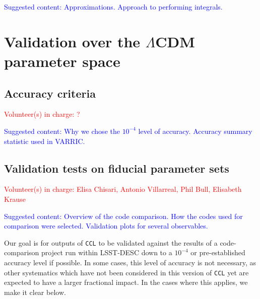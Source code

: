 \documentclass[\docopts]{\docclass}
\newcommand{\vol}[1]{\textcolor{red}{Volunteer(s) in charge: #1}}
\newcommand{\cont}[1]{\textcolor{blue}{Suggested content: #1}}
\newcommand{\ccl}{{\tt CCL}\xspace}
\begin{document}
\cont{Approximations. Approach to performing integrals.}




\section{Validation over the $\Lambda$CDM parameter space}

\subsection{Accuracy criteria}
\vol{?}

\cont{Why we chose the $10^{-4}$ level of accuracy. Accuracy summary statistic used in VARRIC.}

\subsection{Validation tests on fiducial parameter sets}
\vol{Elisa Chisari, Antonio Villarreal, Phil Bull, Elisabeth Krause}

\cont{Overview of the code comparison. How the codes used for comparison were selected. Validation plots for several observables.}

Our goal is for outputs of \ccl to be validated against the results of a code-comparison project run within LSST-DESC down to a $10^{-4}$ or pre-established accuracy level if possible. In some cases, this level of accuracy is not necessary, as other systematics which have not been considered in this version of \ccl yet are expected to have a larger fractional impact. In the cases where this applies, we make it clear below.
\end{document}
